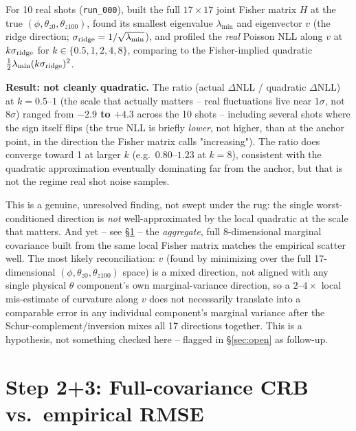 \documentclass[11pt,a4paper]{article}
\newcommand{\code}[1]{\texttt{#1}}
\begin{document}
For 10 real shots (\code{run\_000}), built the full $17\times17$ joint
Fisher matrix $H$ at the true $(\phi,\theta_{z0},\theta_{z100})$, found its
smallest eigenvalue $\lambda_{\min}$ and eigenvector $v$ (the ridge
direction; $\sigma_{\rm ridge}=1/\sqrt{\lambda_{\min}}$), and profiled the
\emph{real} Poisson NLL along $v$ at $k\sigma_{\rm ridge}$ for
$k\in\{0.5,1,2,4,8\}$, comparing to the Fisher-implied quadratic
$\tfrac12\lambda_{\min}(k\sigma_{\rm ridge})^2$.

\textbf{Result: not cleanly quadratic.} The ratio (actual $\Delta$NLL /
quadratic $\Delta$NLL) at $k=0.5$--$1$ (the scale that actually matters --
real fluctuations live near $1\sigma$, not $8\sigma$) ranged from
\textbf{$-2.9$ to $+4.3$} across the 10 shots -- including several shots
where the sign itself flips (the true NLL is briefly \emph{lower}, not
higher, than at the anchor point, in the direction the Fisher matrix calls
"increasing"). The ratio does converge toward 1 at larger $k$ (e.g.\ $0.80$--$1.23$
at $k=8$), consistent with the quadratic approximation eventually dominating
far from the anchor, but that is not the regime real shot noise samples.

This is a genuine, unresolved finding, not swept under the rug: the single
worst-conditioned direction is \emph{not} well-approximated by the local
quadratic at the scale that matters. And yet -- see \S\ref{sec:comparison}
-- the \emph{aggregate}, full 8-dimensional marginal covariance built from
the same local Fisher matrix matches the empirical scatter well. The most
likely reconciliation: $v$ (found by minimizing over the full 17-dimensional
$(\phi,\theta_{z0},\theta_{z100})$ space) is a mixed direction, not aligned
with any single physical $\theta$ component's own marginal-variance
direction, so a $2$--$4\times$ local mis-estimate of curvature along $v$
does not necessarily translate into a comparable error in any individual
component's marginal variance after the Schur-complement/inversion mixes
all 17 directions together. This is a hypothesis, not something checked
here -- flagged in \S\ref{sec:open} as follow-up.

\section{Step 2+3: Full-covariance CRB vs.\ empirical RMSE}
\label{sec:comparison}
\end{document}

